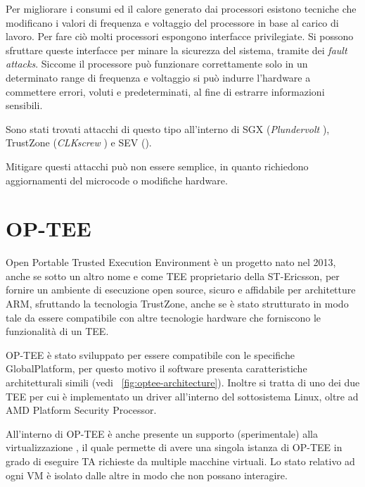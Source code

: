 \documentclass[12pt,italian]{report}
\begin{document}
	\bigbreak
	
	Per migliorare i consumi ed il calore generato dai processori esistono tecniche che modificano i valori di frequenza e voltaggio del processore in base al carico di lavoro. Per fare ciò molti processori espongono interfacce privilegiate. Si possono sfruttare queste interfacce per minare la sicurezza del sistema, tramite dei \textit{fault attacks}. Siccome il processore può funzionare correttamente solo in un determinato range di frequenza e voltaggio si può indurre l'hardware a commettere errori, voluti e predeterminati, al fine di estrarre informazioni sensibili.
	
	Sono stati trovati attacchi di questo tipo all'interno di SGX (\textit{Plundervolt} \cite{plundervolt}), TrustZone (\textit{CLKscrew} \cite{clkscrew}) e SEV (\cite{sev_power_attack}).
	
	Mitigare questi attacchi può non essere semplice, in quanto richiedono aggiornamenti del microcode o modifiche hardware.
	
	\newpage
	
	\section{OP-TEE}
	\label{sec:optee}
	Open Portable Trusted Execution Environment \cite{optee} è un progetto nato nel 2013, anche se sotto un altro nome e come TEE proprietario della ST-Ericsson, per fornire un ambiente di esecuzione open source, sicuro e affidabile per architetture ARM, sfruttando la tecnologia TrustZone, anche se è stato strutturato in modo tale da essere compatibile con altre tecnologie hardware che forniscono le funzionalità di un TEE.
	
	OP-TEE è stato sviluppato per essere compatibile con le specifiche GlobalPlatform, per questo motivo il software presenta caratteristiche architetturali simili (vedi \figurename~\ref{fig:optee-architecture}). Inoltre si tratta di uno dei due TEE per cui è implementato un driver all'interno del sottosistema Linux, oltre ad AMD Platform Security Processor.
	
	\bigbreak 
	
	All'interno di OP-TEE è anche presente un supporto (sperimentale) alla virtualizzazione \cite{optee_virtualization}, il quale permette di avere una singola istanza di OP-TEE in grado di eseguire TA richieste da multiple macchine virtuali. Lo stato relativo ad ogni VM è isolato dalle altre in modo che non possano interagire.
	
	\bigbreak
	
\end{document}
